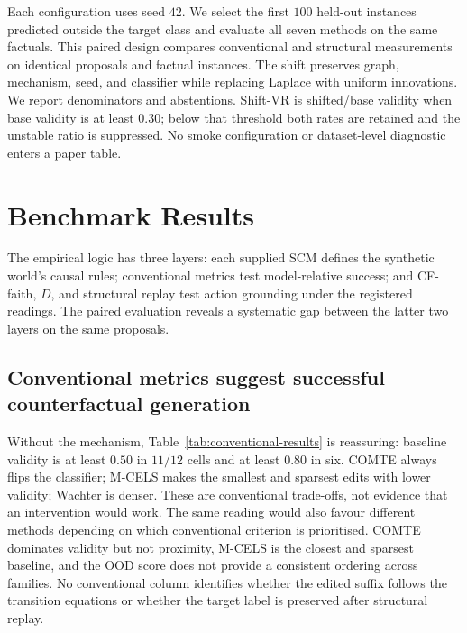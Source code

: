 \documentclass{article}
\begin{document}
Each configuration uses seed $42$.  We select the first $100$ held-out instances predicted outside the target class and evaluate all seven methods on the same factuals.  This paired design compares conventional and structural measurements on identical proposals and factual instances. The shift preserves graph, mechanism, seed, and classifier while replacing Laplace with uniform innovations.  We report denominators and abstentions. Shift-VR is shifted/base validity when base validity is at least $0.30$; below that threshold both rates are retained and the unstable ratio is suppressed. No smoke configuration or dataset-level diagnostic enters a paper table.

\section{Benchmark Results}
\label{sec:results}

The empirical logic has three layers: each supplied SCM defines the synthetic world's causal rules; conventional metrics test model-relative success; and CF-faith, $D$, and structural replay test action grounding under the registered readings. The paired evaluation reveals a systematic gap between the latter two layers on the same proposals.

\subsection{Conventional metrics suggest successful counterfactual generation}
\label{sec:res-conventional}

Without the mechanism, Table~\ref{tab:conventional-results} is reassuring: baseline validity is at least $0.50$ in $11/12$ cells and at least $0.80$ in six.  COMTE always flips the classifier; M-CELS makes the smallest and sparsest edits with lower validity; Wachter is denser.  These are conventional trade-offs, not evidence that an intervention would work.  The same reading would also favour different methods depending on which conventional criterion is prioritised.  COMTE dominates validity but not proximity, M-CELS is the closest and sparsest baseline, and the OOD score does not provide a consistent ordering across families.  No conventional column identifies whether the edited suffix follows the transition equations or whether the target label is preserved after structural replay.
\end{document}
